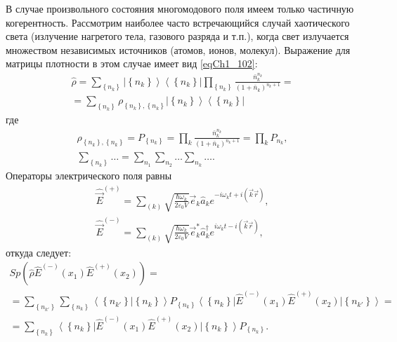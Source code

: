 В случае произвольного состояния многомодового поля имеем только
частичную когерентность. Рассмотрим наиболее часто встречающийся
случай хаотического света (излучение нагретого тела, газового разряда
и т.п.), когда свет излучается множеством независимых источников
(атомов, ионов, молекул). Выражение для матрицы плотности в этом
случае имеет вид \eqref{eqCh1_102}: 
\begin{eqnarray}
\hat{\rho} = 
\sum_{\left\{n_k\right\}} 
 \left|\left\{n_k\right\}\right>\left<\left\{n_k\right\}\right|
\prod_{\left\{n_k\right\}} 
\frac{\bar{n}_k^{n_k}}{\left(1 + \bar{n}_k\right)^{n_k+1}} =
\nonumber \\
= \sum_{\left\{n_k\right\}} \rho_{\left\{n_k\right\},
  \left\{n_k\right\}}
\left|\left\{n_k\right\}\right>\left<\left\{n_k\right\}\right|  
\label{eqCh4_18}
\end{eqnarray}
где
\begin{eqnarray}
\rho_{\left\{n_k\right\},
  \left\{n_k\right\}} =
P_{\left\{n_k\right\}} = 
\prod_k 
\frac{\bar{n}_k^{n_k}}{\left(1 + \bar{n}_k\right)^{n_k+1}} = 
\prod_k P_{n_k},
\nonumber \\
\sum_{\left\{n_k\right\}} \dots = 
\sum_{n_1} \sum_{n_2} \dots \sum_{n_k} \dots. 
\nonumber
\end{eqnarray}
Операторы электрического поля равны
\begin{eqnarray}
\hat{\vec{E}}^{(+)}= \sum_{(k)}\sqrt{\frac{\hbar \omega_k}{2
    \varepsilon_0 V}} \vec{e}_k \hat{a}_k e^{-i \omega_k t + i
    \left(\vec{k} \vec{r}\right)},
\nonumber \\
\hat{\vec{E}}^{(-)}= \sum_{(k)}\sqrt{\frac{\hbar \omega_k}{2
    \varepsilon_0 V}} \vec{e}_k^{*} \hat{a}_k^{\dag} e^{i \omega_k t - i
    \left(\vec{k} \vec{r}\right)},
\label{eqCh4_19}
\end{eqnarray}
откуда следует:
\begin{eqnarray}
Sp \left(
\hat{\rho}\hat{E}^{(-)}\left(x_1\right)
\hat{E}^{(+)}\left(x_2\right)
\right) = 
\nonumber \\
=\sum_{\left\{n_{k'}\right\}}\sum_{\left\{n_{k}\right\}}
\left<\left\{n_{k'}\right\}\right|\left.\left\{n_{k}\right\}\right>
P_{\left\{n_k\right\}}
\left<\left\{n_{k}\right\}\right|
\hat{E}^{(-)}\left(x_1\right)
\hat{E}^{(+)}\left(x_2\right)
\left|\left\{n_{k'}\right\}\right> =
\nonumber \\
= \sum_{\left\{n_{k}\right\}}
\left<\left\{n_{k}\right\}\right|
\hat{E}^{(-)}\left(x_1\right)
\hat{E}^{(+)}\left(x_2\right)
\left|\left\{n_{k}\right\}\right>
P_{\left\{n_k\right\}}.
\label{eqCh4_20}
\end{eqnarray}
